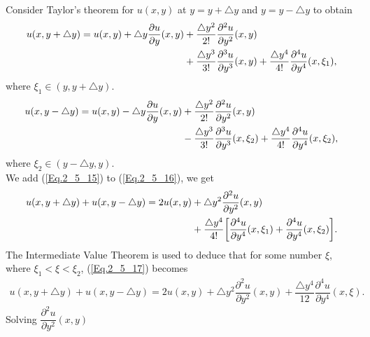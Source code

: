 Consider Taylor's theorem for $u(x, y )$ at $y=y + \triangle y $ and $y = y - \triangle y $ to obtain
\begin{align}{\label{Eq.2_5_15}}
\begin{split}
u(x, y + \triangle y) = u(x,y) + \triangle y \dfrac{\partial u}{\partial y}(x, y) & + \dfrac{\triangle y^{2}}{2!} \dfrac{\partial^2 u}{\partial y^{2}} (x, y) 
\\
& +  \dfrac{\triangle y^{3}}{3!} \dfrac{\partial^3 u}{\partial y^{3}} (x, y) + \dfrac{\triangle y^{4}}{4!} \dfrac{\partial^4 u}{\partial y^{4}} (x, \xi_{1}),
\end{split}
\end{align}
where $\xi_{1} \in (y, y + \triangle y)$.
\begin{align}{\label{Eq.2_5_16}}
\begin{split}
u(x, y - \triangle y) = u(x,y) - \triangle y \dfrac{\partial u}{\partial y}(x, y) & + \dfrac{\triangle y^{2}}{2!} \dfrac{\partial^2 u}{\partial y^{2}} (x, y) 
\\
& -  \dfrac{\triangle y^{3}}{3!} \dfrac{\partial^3 u}{\partial y^{3}} (x,\xi_{2})  + \dfrac{\triangle y^{4}}{4!} \dfrac{\partial^4 u}{\partial y^{4}} (x, \xi_{2}),
\end{split}
\end{align}
where $\xi_{2} \in (y - \triangle y, y)$.
\\
We add (\ref{Eq.2_5_15}) to (\ref{Eq.2_5_16}), we get 
\begin{align}{\label{Eq.2_5_17}}
\begin{split}
u(x, y + \triangle y)+ u(x, y - \triangle y) = 2 u(x, y) & + \triangle y^{2}\dfrac{\partial^2 u}{\partial y^{2}} (x, y) 
\\
& + \dfrac{\triangle y^{4}}{4!} \bigg [ \dfrac{\partial^4 u}{\partial y^{4}} (x,\xi_{1}) +    \dfrac{\partial^4 u}{\partial y^{4}} (x,\xi_{2})  \bigg].
\end{split}
\end{align}
The Intermediate Value Theorem is used to deduce that for some number $\xi$, where $\xi_{1} < \xi < \xi_{2}$, (\ref{Eq.2_5_17}) becomes
\begin{align*}%
u(x, y + \triangle y)+ u(x, y - \triangle y) = 2 u(x, y) + \triangle y^{2}\dfrac{\partial^2 u}{\partial y^{2}} (x, y) +  \dfrac{\triangle y^{4}}{12} \dfrac{\partial^4 u}{\partial y^{4}} (x,\xi).
\end{align*}
Solving $\dfrac{\partial^2 u}{\partial y^{2}} (x, y) $ 
